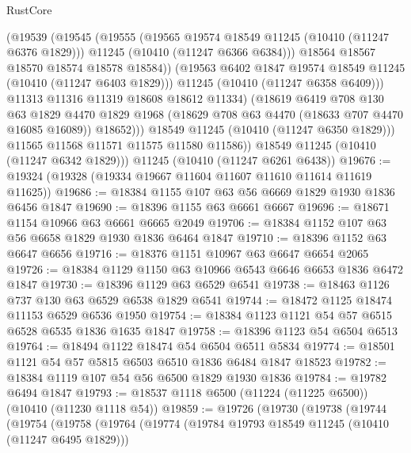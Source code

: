 \begin{lexlean}{RustCore}
\begin{coremodule}
                    (@19539
                      (@19545
                        (@19555
                          (@19565 @19574 @18549 @11245 (@10410 (@11247 @6376 @1829)))
                          @11245
                          (@10410 (@11247 @6366 @6384)))
                        @18564
                        @18567
                        @18570
                        @18574
                        @18578
                        @18584))
                    (@19563 @6402 @1847 @19574 @18549 @11245 (@10410 (@11247 @6403 @1829)))
                    @11245
                    (@10410 (@11247 @6358 @6409)))
                  @11313
                  @11316
                  @11319
                  @18608
                  @18612
                  @11334)
                (@18619
                  @6419
                  @708
                  @130
                  @63
                  @1829
                  @4470
                  @1829
                  @1968
                  (@18629 @708 @63 @4470 (@18633 @707 @4470 @16085 @16089))
                  @18652)))
            @18549
            @11245
            (@10410 (@11247 @6350 @1829)))
          @11565
          @11568
          @11571
          @11575
          @11580
          @11586))
      @18549
      @11245
      (@10410 (@11247 @6342 @1829)))
    @11245
    (@10410 (@11247 @6261 @6438))
@19676 := @19324 (@19328 (@19334 @19667 @11604 @11607 @11610 @11614 @11619 @11625))
@19686 := @18384 @1155 @107 @63 @56 @6669 @1829 @1930 @1836 @6456 @1847
@19690 := @18396 @1155 @63 @6661 @6667
@19696 := @18671 @1154 @10966 @63 @6661 @6665 @2049
@19706 := @18384 @1152 @107 @63 @56 @6658 @1829 @1930 @1836 @6464 @1847
@19710 := @18396 @1152 @63 @6647 @6656
@19716 := @18376 @1151 @10967 @63 @6647 @6654 @2065
@19726 := @18384 @1129 @1150 @63 @10966 @6543 @6646 @6653 @1836 @6472 @1847
@19730 := @18396 @1129 @63 @6529 @6541
@19738 := @18463 @1126 @737 @130 @63 @6529 @6538 @1829 @6541
@19744 := @18472 @1125 @18474 @11153 @6529 @6536 @1950
@19754 := @18384 @1123 @1121 @54 @57 @6515 @6528 @6535 @1836 @1635 @1847
@19758 := @18396 @1123 @54 @6504 @6513
@19764 := @18494 @1122 @18474 @54 @6504 @6511 @5834
@19774 := @18501 @1121 @54 @57 @5815 @6503 @6510 @1836 @6484 @1847 @18523
@19782 := @18384 @1119 @107 @54 @56 @6500 @1829 @1930 @1836
@19784 := @19782 @6494 @1847
@19793 := @18537 @1118 @6500 (@11224 (@11225 @6500)) (@10410 (@11230 @1118 @54))
@19859 := @19726
    (@19730
      (@19738
        (@19744
          (@19754
            (@19758
              (@19764
                (@19774
                  (@19784 @19793 @18549 @11245 (@10410 (@11247 @6495 @1829)))

\end{coremodule}
\end{lexlean}
